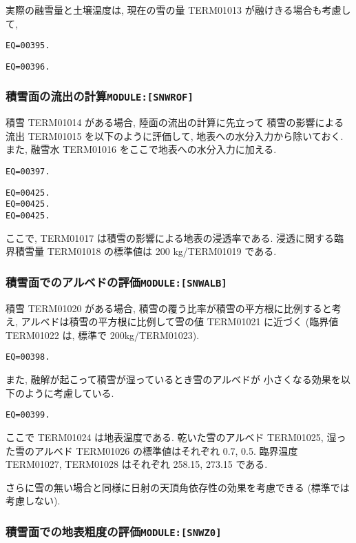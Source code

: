 実際の融雪量と土壌温度は, 現在の雪の量 TERM01013 が融けきる場合も考慮して, 
\begin{verbatim}
EQ=00395.
\end{verbatim}
\begin{verbatim}
EQ=00396.
\end{verbatim}

\subsubsection{積雪面の流出の計算\texttt{MODULE:[SNWROF]}}
 
積雪 TERM01014 がある場合, 陸面の流出の計算に先立って
積雪の影響による流出 TERM01015 を以下のように評価して, 
地表への水分入力から除いておく. 
また, 融雪水 TERM01016 をここで地表への水分入力に加える. 
\begin{verbatim}
EQ=00397.
\end{verbatim}
\begin{verbatim}
EQ=00425.
EQ=00425.
EQ=00425.
\end{verbatim}
ここで, TERM01017 は積雪の影響による地表の浸透率である. 
浸透に関する臨界積雪量 TERM01018 の標準値は 200 kg/TERM01019 である. 

\subsubsection{積雪面でのアルベドの評価\texttt{MODULE:[SNWALB]}}

積雪 TERM01020 がある場合, 
積雪の覆う比率が積雪の平方根に比例すると考え,
アルベドは積雪の平方根に比例して雪の値 TERM01021 に近づく
(臨界値 TERM01022 は, 標準で 200kg/TERM01023).
%
\begin{verbatim}
EQ=00398.
\end{verbatim}

また, 融解が起こって積雪が湿っているとき雪のアルベドが
小さくなる効果を以下のように考慮している. 
\begin{verbatim}
EQ=00399.
\end{verbatim}
ここで TERM01024 は地表温度である. 
乾いた雪のアルベド TERM01025, 湿った雪のアルベド TERM01026
の標準値はそれぞれ 0.7, 0.5. 
臨界温度 TERM01027, TERM01028 はそれぞれ 258.15, 273.15 である. 

さらに雪の無い場合と同様に日射の天頂角依存性の効果を考慮できる
(標準では考慮しない). 

\subsubsection{積雪面での地表粗度の評価\texttt{MODULE:[SNWZ0]}}

